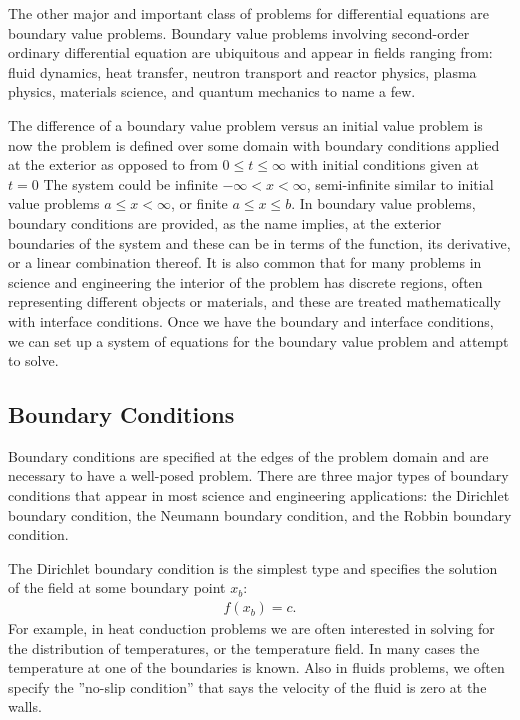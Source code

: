 The other major and important class of problems for differential equations are boundary value problems. Boundary value problems involving second-order ordinary differential equation are ubiquitous and appear in fields ranging from: fluid dynamics, heat transfer, neutron transport and reactor physics, plasma physics, materials science, and quantum mechanics to name a few.

The difference of a boundary value problem versus an initial value problem is now the problem is defined over some domain with boundary conditions applied at the exterior as opposed to from $0 \le t \le \infty$ with initial conditions given at $t = 0$ The system could be infinite $-\infty < x < \infty$, semi-infinite similar to initial value problems $a \le x < \infty$, or finite $a \le x \le b$. In boundary value problems, boundary conditions are provided, as the name implies, at the exterior boundaries of the system and these can be in terms of the function, its derivative, or a linear combination thereof. It is also common that for many problems in science and engineering the interior of the problem has discrete regions, often representing different objects or materials, and these are treated mathematically with interface conditions. Once we have the boundary and interface conditions, we can set up a system of equations for the boundary value problem and attempt to solve. 

\subsection{Boundary Conditions}

Boundary conditions are specified at the edges of the problem domain and are necessary to have a well-posed problem. There are three major types of boundary conditions that appear in most science and engineering applications: the Dirichlet boundary condition, the Neumann boundary condition, and the Robbin boundary condition.

The Dirichlet boundary condition is the simplest type and specifies the solution of the field at some boundary point $x_b$:
\begin{align}
  f(x_b) = c.
\end{align}
For example, in heat conduction problems we are often interested in solving for the distribution of temperatures, or the temperature field. In many cases the temperature at one of the boundaries is known. Also in fluids problems, we often specify the ''no-slip condition'' that says the velocity of the fluid is zero at the walls.

